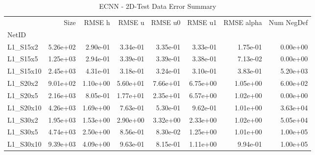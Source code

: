 \documentclass{article}
\theoremstyle{remark}
\numberwithin{equation}{subsection}
\begin{document}
\begin{figure}[H]
\end{figure}

\begin{table}[H]

\begin{tabular}{lrrrrrrr}
	\toprule
	{} &     Size &   RMSE h &   RMSE u &  RMSE u0 &  RMSE u1 &  RMSE alpha &  Num NegDef \\
	NetID     &          &          &          &          &          &             &             \\
	\midrule
	L1\_S15x2  & 5.26e+02 & 2.90e-01 & 3.34e-01 & 3.35e-01 & 3.33e-01 &    1.75e-01 &    0.00e+00 \\
	L1\_S15x5  & 1.25e+03 & 2.94e-01 & 3.39e-01 & 3.39e-01 & 3.38e-01 &    7.13e-02 &    0.00e+00 \\
	L1\_S15x10 & 2.45e+03 & 4.31e-01 & 3.18e-01 & 3.24e-01 & 3.10e-01 &    3.83e-01 &    5.20e+03 \\
	L1\_S20x2  & 9.01e+02 & 1.10e+00 & 5.60e+01 & 7.66e+01 & 6.75e+00 &    1.05e+00 &    6.00e+02 \\
	L1\_S20x5  & 2.16e+03 & 8.05e-01 & 1.77e+01 & 2.35e+01 & 6.57e+00 &    1.02e+00 &    0.00e+00 \\
	L1\_S20x10 & 4.26e+03 & 1.69e+00 & 7.63e-01 & 5.30e-01 & 9.62e-01 &    1.01e+00 &    3.63e+04 \\
	L1\_S30x2  & 1.95e+03 & 1.53e+00 & 2.90e+00 & 3.32e+00 & 2.33e+00 &    1.02e+00 &    5.05e+04 \\
	L1\_S30x5  & 4.74e+03 & 2.50e+00 & 8.56e-01 & 8.30e-02 & 1.25e+00 &    1.01e+00 &    1.00e+05 \\
	L1\_S30x10 & 9.39e+03 & 4.09e+00 & 9.63e-01 & 8.15e-01 & 1.11e+00 &    9.94e-01 &    1.00e+05 \\
	\bottomrule
\end{tabular}
\caption{ECNN - 2D-Test Data Error Summary}
\end{table}
\end{document}
